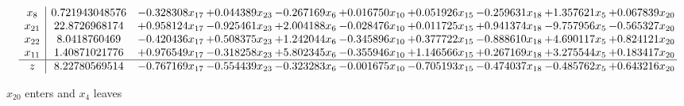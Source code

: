 \documentclass[10pt]{article}
\begin{document}
\[\begin{array}{c| c c@{\hskip 2pt} c@{\hskip 2pt} c@{\hskip 2pt} c@{\hskip 2pt} c@{\hskip 2pt} c@{\hskip 2pt} c@{\hskip 2pt} c@{\hskip 2pt} }
 x_{8}   &  0.721943048576 & -0.328308 x_{17} & + 0.044389 x_{23} & -0.267169 x_{6} & + 0.016750 x_{10} & + 0.051926 x_{15} & -0.259631 x_{18} & + 1.357621 x_{5} & + 0.067839 x_{20}\\
 x_{21}   &  22.8726968174 & + 0.958124 x_{17} & -0.925461 x_{23} & + 2.004188 x_{6} & -0.028476 x_{10} & + 0.011725 x_{15} & + 0.941374 x_{18} & -9.757956 x_{5} & -0.565327 x_{20}\\
 x_{22}   &  8.0418760469 & -0.420436 x_{17} & + 0.508375 x_{23} & + 1.242044 x_{6} & -0.345896 x_{10} & + 0.377722 x_{15} & -0.888610 x_{18} & + 4.690117 x_{5} & + 0.824121 x_{20}\\
 x_{11}   &  1.40871021776 & + 0.976549 x_{17} & -0.318258 x_{23} & + 5.802345 x_{6} & -0.355946 x_{10} & + 1.146566 x_{15} & + 0.267169 x_{18} & + 3.275544 x_{5} & + 0.183417 x_{20}\\
\hline
z    &  8.22780569514 & -0.767169 x_{17} & -0.554439 x_{23} & -0.323283 x_{6} & -0.001675 x_{10} & -0.705193 x_{15} & -0.474037 x_{18} & -0.485762 x_{5} & + 0.643216 x_{20}\\
\end{array}\]


 $ x_{20} $ enters and $ x_{4} $ leaves 
\end{document}
